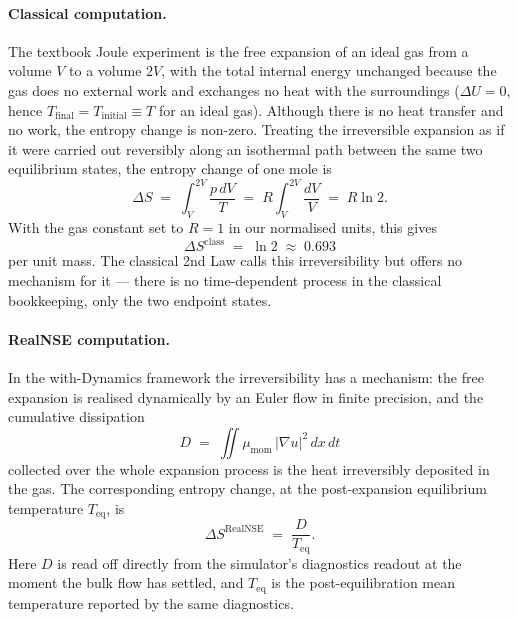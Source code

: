 \paragraph{Classical computation.}
The textbook Joule experiment is the free expansion of an ideal gas
from a volume $V$ to a volume $2V$, with the total internal energy
unchanged because the gas does no external work and exchanges no heat
with the surroundings ($\Delta U = 0$, hence $T_{\mathrm{final}} =
T_{\mathrm{initial}} \equiv T$ for an ideal gas). Although there is no
heat transfer and no work, the entropy change is non-zero. Treating
the irreversible expansion as if it were carried out reversibly along
an isothermal path between the same two equilibrium states, the
entropy change of one mole is
\begin{equation}\label{eq:joule_dS_classical}
  \Delta S \;=\; \int_{V}^{2V} \frac{p\,dV}{T}
              \;=\; R \int_{V}^{2V} \frac{dV}{V}
              \;=\; R \ln 2.
\end{equation}
With the gas constant set to $R=1$ in our normalised units, this gives
\[
  \Delta S^{\mathrm{class}} \;=\; \ln 2 \;\approx\; 0.693
\]
per unit mass. The classical 2nd Law calls this irreversibility but
offers no mechanism for it --- there is no time-dependent process in
the classical bookkeeping, only the two endpoint states.

\paragraph{RealNSE computation.}
In the with-Dynamics framework the irreversibility has a mechanism: the
free expansion is realised dynamically by an Euler flow in finite
precision, and the cumulative dissipation
\[
  D \;=\; \iint \mu_{\mathrm{mom}}\,|\nabla u|^2\,dx\,dt
\]
collected over the whole expansion process is the heat irreversibly
deposited in the gas. The corresponding entropy change, at the
post-expansion equilibrium temperature $T_{\mathrm{eq}}$, is
\begin{equation}\label{eq:joule_dS_rns}
  \Delta S^{\mathrm{RealNSE}} \;=\; \frac{D}{T_{\mathrm{eq}}}.
\end{equation}
Here $D$ is read off directly from the simulator's diagnostics readout
at the moment the bulk flow has settled, and $T_{\mathrm{eq}}$ is the
post-equilibration mean temperature reported by the same diagnostics.

